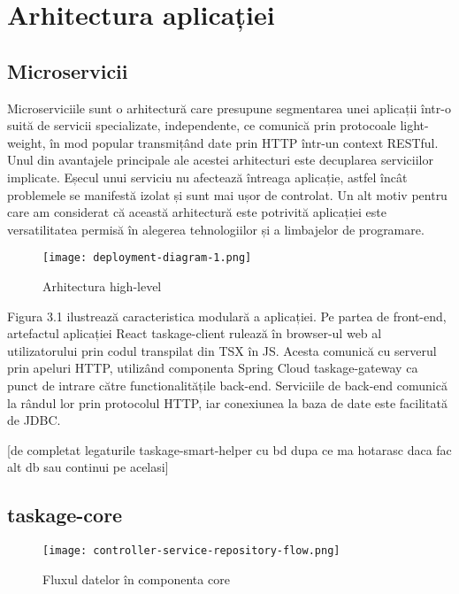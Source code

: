 \chapter{Arhitectura aplicației}

\section{Microservicii}

Microserviciile sunt o arhitectură care presupune segmentarea unei aplicații într-o suită de servicii specializate, independente, ce comunică prin protocoale light-weight, în mod popular transmițând date prin HTTP într-un context RESTful. Unul din avantajele principale ale acestei arhitecturi este decuplarea serviciilor implicate. Eșecul unui serviciu nu afectează întreaga aplicație, astfel încât problemele se manifestă izolat și sunt mai ușor de controlat. Un alt motiv pentru care am considerat că această arhitectură este potrivită aplicației este versatilitatea permisă în alegerea tehnologiilor și a limbajelor de programare. 

 \begin{figure}[ht]
	\centering
 	 \texttt{[image: deployment-diagram-1.png]}
	\caption{Arhitectura high-level}
	\label{fig:deployment-diagram-1}
 \end{figure}

Figura 3.1 ilustrează caracteristica modulară a aplicației. Pe partea de front-end, artefactul aplicației React taskage-client rulează în browser-ul web al utilizatorului prin codul transpilat din TSX în JS. Acesta comunică cu serverul prin apeluri HTTP, utilizând componenta Spring Cloud taskage-gateway ca punct de intrare către functionalitățile back-end. Serviciile de back-end comunică la rândul lor prin protocolul HTTP, iar conexiunea la baza de date este facilitată de JDBC.

[de completat legaturile taskage-smart-helper cu bd dupa ce ma hotarasc daca fac alt db sau continui pe acelasi]

\section{taskage-core}

 \begin{figure}[ht]
	\centering
 	 \texttt{[image: controller-service-repository-flow.png]}
	\caption{Fluxul datelor în componenta core}
	\label{controller-service-repository-flow}
 \end{figure}


